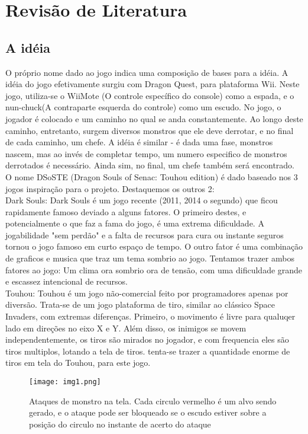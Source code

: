 \documentclass[12pt]{article}
\begin{document}
\section{Revisão de Literatura}

\subsection{A idéia}
O próprio nome dado ao jogo indica uma composição de bases para a idéia. A idéia do jogo efetivamente surgiu com Dragon Quest, para plataforma Wii. Neste jogo, utiliza-se o WiiMote (O controle específico do console) como a espada, e o nun-chuck(A contraparte esquerda do controle) como um escudo. 
No jogo, o jogador é colocado e um caminho no qual se anda constantemente. Ao longo deste caminho, entretanto, surgem diversos monstros que ele deve derrotar, e no final de cada caminho, um chefe.
A idéia é similar - é dada uma fase, monstros nascem, mas ao invés de completar tempo, um numero especifico de monstros derrotados é necessário. Ainda sim, no final, um chefe também será encontrado.
\\
O nome DSoSTE (Dragon Souls of Senac: Touhou edition) é dado baseado nos 3 jogos inspiração para o projeto. Destaquemos os outros 2:
\\
Dark Souls: Dark Souls é um jogo recente (2011, 2014 o segundo) que ficou rapidamente famoso deviado a alguns fatores. O primeiro destes, e potencialmente o que faz a fama do jogo, é uma extrema dificuldade. A jogabilidade "sem perdão" e a falta de recursos para cura ou instante seguros tornou o jogo famoso em curto espaço de tempo. O outro fator é uma combinação de graficos e musica que traz um tema sombrio ao jogo.
Tentamos trazer ambos fatores ao jogo: Um clima ora sombrio ora de tensão, com uma dificuldade grande e escassez intencional de recursos.
\\
Touhou: Touhou é um jogo não-comercial feito por programadores apenas por diversão. Trata-se de um jogo plataforma de tiro, similar ao clássico Space Invaders, com extremas diferenças. Primeiro, o movimento é livre para qualuqer lado em direções no eixo X e Y. Além disso, os inimigos se movem independentemente, os tiros são mirados no jogador, e com frequencia eles são tiros multiplos, lotando a tela de tiros.
tenta-se trazer a quantidade enorme de tiros em tela do Touhou, para este jogo. 

\begin{figure}[ht!]
\centering
\texttt{[image: img1.png]}
\caption{Ataques de monstro na tela. Cada circulo vermelho é um alvo sendo gerado, e o ataque pode ser bloqueado se o escudo estiver sobre a posição do circulo no instante de acerto do ataque}
\label{fig:img1}
\end{figure}
\end{document}
